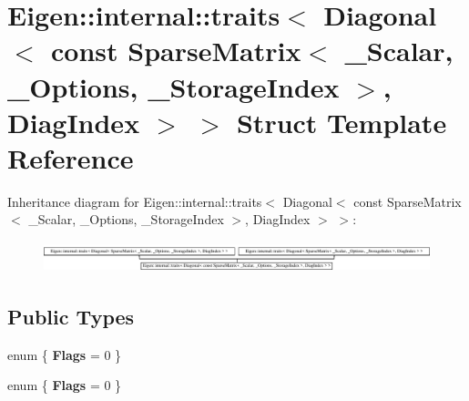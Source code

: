 \hypertarget{struct_eigen_1_1internal_1_1traits_3_01_diagonal_3_01const_01_sparse_matrix_3_01___scalar_00_01_60e2cc1eeaa955bbaca3dbe42dd8c748}{}\section{Eigen\+:\+:internal\+:\+:traits$<$ Diagonal$<$ const Sparse\+Matrix$<$ \+\_\+\+Scalar, \+\_\+\+Options, \+\_\+\+Storage\+Index $>$, Diag\+Index $>$ $>$ Struct Template Reference}
\label{struct_eigen_1_1internal_1_1traits_3_01_diagonal_3_01const_01_sparse_matrix_3_01___scalar_00_01_60e2cc1eeaa955bbaca3dbe42dd8c748}
Inheritance diagram for Eigen\+:\+:internal\+:\+:traits$<$ Diagonal$<$ const Sparse\+Matrix$<$ \+\_\+\+Scalar, \+\_\+\+Options, \+\_\+\+Storage\+Index $>$, Diag\+Index $>$ $>$\+:\begin{figure}[H]
\begin{center}
\leavevmode
\includegraphics[height=0.898876cm]{struct_eigen_1_1internal_1_1traits_3_01_diagonal_3_01const_01_sparse_matrix_3_01___scalar_00_01_60e2cc1eeaa955bbaca3dbe42dd8c748}
\end{center}
\end{figure}
\subsection*{Public Types}
\begin{DoxyCompactItemize}
\item 
\mbox{\label{struct_eigen_1_1internal_1_1traits_3_01_diagonal_3_01const_01_sparse_matrix_3_01___scalar_00_01_60e2cc1eeaa955bbaca3dbe42dd8c748_a5a736d9ab3f07d5bd73ad94c06b99795}} 
enum \{ {\bfseries Flags} = 0
 \}
\item 
\mbox{\label{struct_eigen_1_1internal_1_1traits_3_01_diagonal_3_01const_01_sparse_matrix_3_01___scalar_00_01_60e2cc1eeaa955bbaca3dbe42dd8c748_ab6e219bf6fabaa4f1960170cfa44b8bf}} 
enum \{ {\bfseries Flags} = 0
 \}
\end{DoxyCompactItemize}


